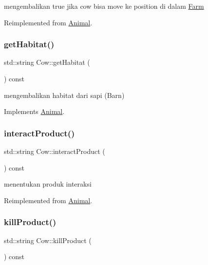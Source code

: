 mengembalikan true jika cow bisa move ke position di dalam \mbox{\hyperlink{class_farm}{Farm}} 

Reimplemented from \mbox{\hyperlink{class_animal_a0529aaf00a6368ea123110683cc4e2f2}{Animal}}.

\mbox{\label{class_cow_a16572694f707fef1a15767c7e219e64c}} 
\subsubsection{\texorpdfstring{getHabitat()}{getHabitat()}}
{\footnotesize\ttfamily std\+::string Cow\+::get\+Habitat (\begin{DoxyParamCaption}{ }\end{DoxyParamCaption}) const\hspace{0.3cm}{\ttfamily [virtual]}}

mengembalikan habitat dari sapi (Barn) 

Implements \mbox{\hyperlink{class_animal_a3de687fb42b792132a09176c4a0e2125}{Animal}}.

\mbox{\label{class_cow_aceeee175e5611b3c963dc3000991eaeb}} 
\subsubsection{\texorpdfstring{interactProduct()}{interactProduct()}}
{\footnotesize\ttfamily std\+::string Cow\+::interact\+Product (\begin{DoxyParamCaption}{ }\end{DoxyParamCaption}) const\hspace{0.3cm}{\ttfamily [virtual]}}

menentukan produk interaksi 

Reimplemented from \mbox{\hyperlink{class_animal_a8e99d809fbff9cea27dee5a785932dc6}{Animal}}.

\mbox{\label{class_cow_a063e4f8d17216c2cdb4b967d508e1c92}} 
\subsubsection{\texorpdfstring{killProduct()}{killProduct()}}
{\footnotesize\ttfamily std\+::string Cow\+::kill\+Product (\begin{DoxyParamCaption}{ }\end{DoxyParamCaption}) const\hspace{0.3cm}{\ttfamily [virtual]}}

